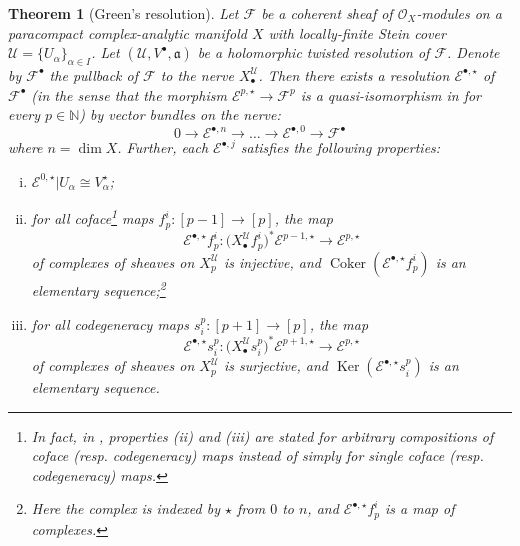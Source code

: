 \documentclass[11pt,fleqn]{article}
\theoremstyle{plain}
\newtheorem{theorem}{Theorem}[subsection]
\theoremstyle{definition}
\theoremstyle{remark}
\numberwithin{equation}{theorem}
\newcommand{\cover}{\mathcal{U}}
\newcommand{\OO}{\mathcal{O}}
\newcommand{\anotherbullet}{\star}
\newcommand{\restricted}{\mathbin{\big\vert}}
\newcommand{\twc}{\mathfrak{a}}
\newcommand{\nerve}[1]{X_{#1}^\cover}
\DeclareMathOperator{\Ker}{Ker}
\DeclareMathOperator{\Coker}{Coker}
\begin{document}
        \begin{theorem}[Green's resolution]\label{theorem:green's-resolution}
            Let $\mathscr{F}$ be a coherent sheaf of $\OO_X$-modules on a paracompact complex-analytic manifold $X$ with locally-finite Stein cover $\cover=\{U_\alpha\}_{\alpha\in I}$.
            Let $(\cover,V^\bullet,\twc)$ be a holomorphic twisted resolution of $\mathscr{F}$.
            Denote by $\mathscr{F}^\bullet$ the pullback of $\mathscr{F}$ to the nerve $\nerve{\bullet}$.
            Then there exists a resolution $\mathcal{E}^{\bullet,\anotherbullet}$ of $\mathscr{F}^\bullet$ (in the sense that the morphism $\mathcal{E}^{p,\anotherbullet}\to\mathscr{F}^p$ is a quasi-isomorphism in for every $p\in\mathbb{N}$) by vector bundles on the nerve:
            \begin{equation*}
                0 \to \mathcal{E}^{\bullet,n} \to \ldots \to \mathcal{E}^{\bullet,0} \to \mathscr{F}^\bullet
            \end{equation*}
            where $n=\dim X$.
            Further, each $\mathcal{E}^{\bullet,j}$ satisfies the following properties:
            \begin{enumerate}[(i)]
                \item $\mathcal{E}^{0,\anotherbullet}\restricted {U_\alpha} \cong V^\anotherbullet_\alpha$;
                \item for all coface\footnote{In fact, in \cite[§1.4]{Green1980}, properties (ii) and (iii) are stated for arbitrary compositions of coface (resp. codegeneracy) maps instead of simply for single coface (resp. codegeneracy) maps.} maps $f_p^i\colon[p-1]\to[p]$, the map
                    \[
                        \mathcal{E}^{\bullet,\anotherbullet} f_p^i\colon \big(\nerve{\bullet} f_p^i\big)^*\mathcal{E}^{p-1,\anotherbullet}\to\mathcal{E}^{p,\anotherbullet}
                    \]
                    of complexes of sheaves on $\nerve{p}$ is injective, and $\Coker\left(\mathcal{E}^{\bullet,\anotherbullet} f_p^i\right)$ is an elementary sequence;\footnote{Here the complex is indexed by $\anotherbullet$ from $0$ to $n$, and $\mathcal{E}^{\bullet,\anotherbullet} f_p^i$ is a map of complexes.}
                \item for all codegeneracy maps $s_i^p\colon[p+1]\to[p]$, the map
                    \[
                        \mathcal{E}^{\bullet,\anotherbullet} s_i^p\colon \big(\nerve{\bullet} s_i^p\big)^*\mathcal{E}^{p+1,\anotherbullet}\to\mathcal{E}^{p,\anotherbullet}
                    \]
                    of complexes of sheaves on $\nerve{p}$ is surjective, and $\Ker\left(\mathcal{E}^{\bullet,\anotherbullet} s_i^p\right)$ is an elementary sequence.

\end{enumerate}
\end{theorem}
\end{document}
